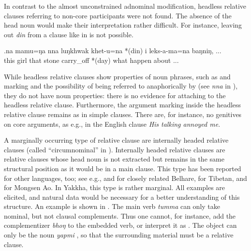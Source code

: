 In contrast to the almost unconstrained adnominal modification, headless relative clauses referring to non-core participants were not found. The absence of the head noun would make their interpretation rather difficult. For instance, leaving out \emph{din}  from a clause like in \Next is not possible. 

\exg.na   mamu=ŋa   nna  luŋkhwak khet-u=na  *(din) i leks-a-ma=na  baŋniŋ, ...\\
this girl that stone  carry\_off *(day) what happen about ...\\
 


While headless relative clauses show  properties of noun phrases, such as  and  marking and the possibility of being referred to anaphorically by  (see \emph{nna} in \LLast[a]), they do not have noun properties: there is  no evidence for  attaching to the headless relative clause. Furthermore, the argument marking inside the headless relative clause remains as in simple clauses. There are, for instance, no genitives on core arguments, as e.g., in the English clause \emph{His talking annoyed me}. 

A marginally occurring type of relative clause are internally headed relative clauses (called “circumnominal” in \citealt{Lehmann1984Der-Relativsatz}). Internally headed relative clauses are relative clauses whose head noun is not extracted but remains in the same structural position as it would be in a main clause. This type has been reported for other  languages, too; see e.g., \citet[3]{Bickel2005On-the-typological} and \cite{Bickel1999Nominalization} for closely related Belhare, \citet[245]{DeLancey1999Relativization} for Tibetan, and \citet[255]{Coupe2007_Mongsen} for Mongsen Ao. In Yakkha, this type is rather marginal. All examples are elicited, and natural data would be necessary for a better understanding of this structure. An example is shown in \Next. The main verb \emph{tumma}  can only take nominal, but not clausal complements. Thus one cannot, for instance, add the complementizer \emph{bhoŋ} to the embedded verb, or interpret it as . The object can only be the noun \emph{yapmi} , so that the surrounding material must be a relative clause.


